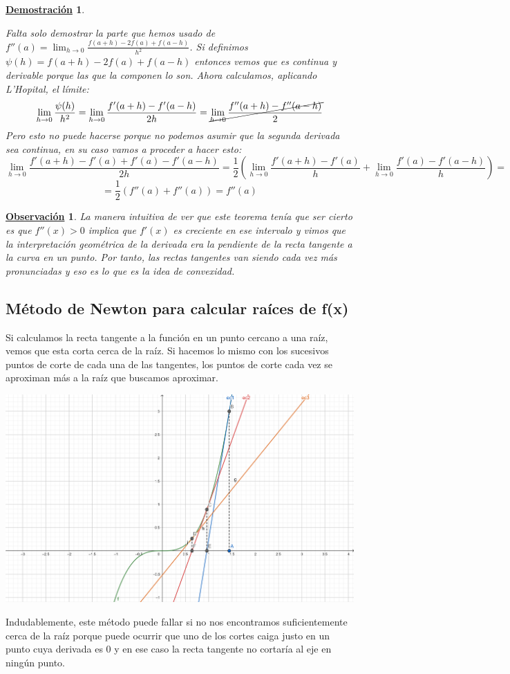 \documentclass[10pt,a4paper,openright]{book}
\theoremstyle{break}
\newtheorem*{demo}{\underline{Demostración}}
\newtheorem{obs}{\underline{Observación}}[chapter]
\begin{document}
\begin{demo}
\begin{itemize}
Falta solo demostrar la parte que hemos usado de $f''(a)=\lim_{h\rightarrow 0 }\frac{f(a+h)-2f(a)+f(a-h)}{h^2}$. Si definimos $\psi(h) = f(a+h)-2f(a)+f(a-h)$ entonces vemos que es continua y derivable porque las que la componen lo son. Ahora calculamos, aplicando L'Hopital, el límite:
$$\lim_{h\rightarrow 0}\frac{\psi(h)}{h^2}=\lim_{h\rightarrow 0}\frac{f'(a+h)-f'(a-h)}{2h}= \cancel{\lim_{h\rightarrow 0}\frac{f''(a+h)-f''(a-h)}{2}}$$
Pero esto no puede hacerse porque no podemos asumir que la segunda derivada sea continua, en su caso vamos a proceder a hacer esto:
$$\lim_{h\rightarrow 0} \frac{f'(a+h)-f'(a)+f'(a)-f'(a-h)}{2h}= \frac{1}{2}\left(\lim_{h\rightarrow 0}\frac{f'(a+h)-f'(a)}{h}+ \lim_{h\rightarrow 0} \frac{f'(a)-f'(a-h)}{h}\right) = $$
$$=\frac{1}{2}\left(f''(a)+ f''(a)\right)=f''(a)$$
\end{itemize}
\end{demo}

\begin{obs}
La manera intuitiva de ver que este teorema tenía que ser cierto es que $f''(x)>0$ implica que $f'(x)$ es creciente en ese intervalo y vimos que la interpretación geométrica de la derivada era la pendiente de la recta tangente a la curva en un punto. Por tanto, las rectas tangentes van siendo cada vez más pronunciadas y eso es lo que es la idea de convexidad.
\end{obs}

\subsection{Método de Newton para calcular raíces de f(x)}
Si calculamos la recta tangente a la función en un punto cercano a una raíz, vemos que esta corta cerca de la raíz. Si hacemos lo mismo con los sucesivos puntos de corte de cada una de las tangentes, los puntos de corte cada vez se aproximan más a la raíz que buscamos aproximar.
\begin{center}
\includegraphics[scale=1.6]{metodo Newton}
\end{center}
Indudablemente, este método puede fallar si no nos encontramos suficientemente cerca de la raíz porque puede ocurrir que uno de los cortes caiga justo en un punto cuya derivada es 0 y en ese caso la recta tangente no cortaría al eje en ningún punto.
\end{document}
